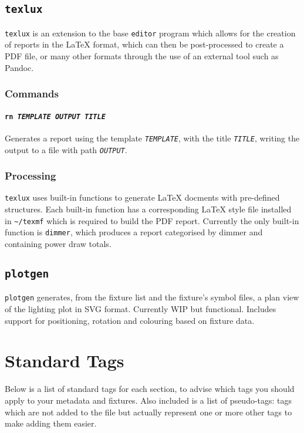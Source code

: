 \documentclass[a4paper]{article}
\begin{document}
\subsection{\texttt{texlux}}
\texttt{texlux} is an extension to the base \texttt{editor} program which 
allows for the creation of reports in the \LaTeX{} format, which can then be 
post-processed to create a PDF file, or many other formats through the use of 
an external tool such as Pandoc.

\subsubsection{Commands}

\paragraph{\texttt{rn \textit{TEMPLATE OUTPUT TITLE}}}
Generates a report using the template \texttt{\textit{TEMPLATE}}, with the 
title \texttt{\textit{TITLE}}, writing the output to a file with path 
\texttt{\textit{OUTPUT}}.

\subsubsection{Processing}

\texttt{texlux} uses built-in functions to generate \LaTeX{} docments with 
pre-defined structures. Each built-in function has a corresponding \LaTeX{} 
style file installed in \texttt{\~{}/texmf} which is required to build 
the PDF report. Currently the only built-in function is \texttt{dimmer}, which 
produces a report categorised by dimmer and containing power draw totals.

\subsection{\texttt{plotgen}}
\texttt{plotgen} generates, from the fixture list and the fixture's symbol 
files, a plan view of the lighting plot in SVG format. Currently WIP but 
functional. Includes support for positioning, rotation and colouring based 
on fixture data.

\section{Standard Tags} \label{sec:plotfile}
Below is a list of standard tags for each section, to advise which tags you 
should apply to your metadata and fixtures. Also included is a list of 
pseudo-tags: tags which are not added to the file but actually represent one 
or more other tags to make adding them easier.
\end{document}

